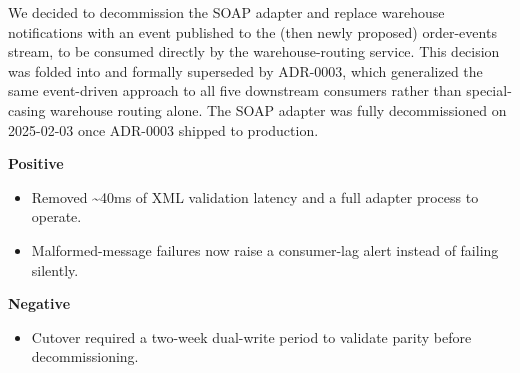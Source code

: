 \documentclass[10pt]{article}
\begin{document}
\begin{decbox}
We decided to decommission the SOAP adapter and replace warehouse notifications with an event published to the (then newly proposed) order-events stream, to be consumed directly by the warehouse-routing service. This decision was folded into and formally superseded by ADR-0003, which generalized the same event-driven approach to all five downstream consumers rather than special-casing warehouse routing alone. The SOAP adapter was fully decommissioned on 2025-02-03 once ADR-0003 shipped to production.
\end{decbox}

\begin{consbox}
\noindent
\begin{minipage}[t]{0.48\linewidth}
\textbf{\textcolor{adrgreen}{Positive}}
\begin{itemize}
\item[\textcolor{adrgreen}{\faCheckCircle}] Removed \textasciitilde40ms of XML validation latency and a full adapter process to operate.
\item[\textcolor{adrgreen}{\faCheckCircle}] Malformed-message failures now raise a consumer-lag alert instead of failing silently.
\end{itemize}
\end{minipage}\hfill
\begin{minipage}[t]{0.48\linewidth}
\textbf{\textcolor{adrred}{Negative}}
\begin{itemize}
\item[\textcolor{adrred}{\faTimesCircle}] Cutover required a two-week dual-write period to validate parity before decommissioning.
\end{itemize}
\end{minipage}
\end{consbox}
\end{document}
